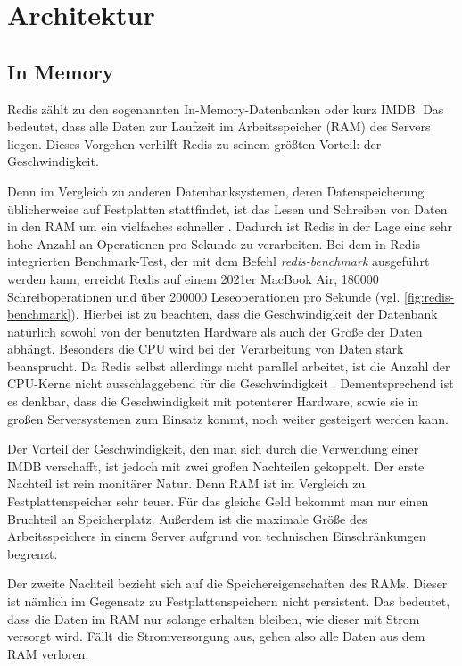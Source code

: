 \section{Architektur}

\subsection{In Memory}
Redis zählt zu den sogenannten In-Memory-Datenbanken oder kurz IMDB. 
Das bedeutet, dass alle Daten zur Laufzeit im Arbeitsspeicher (RAM) des Servers liegen.
Dieses Vorgehen verhilft Redis zu seinem größten Vorteil: der Geschwindigkeit.

Denn im Vergleich zu anderen Datenbanksystemen, deren Datenspeicherung üblicherweise auf Festplatten stattfindet, ist das Lesen und Schreiben von Daten in den RAM um ein vielfaches schneller \cite{VL_Rechnerarchitektur}.
Dadurch ist Redis in der Lage eine sehr hohe Anzahl an Operationen pro Sekunde zu verarbeiten.
Bei dem in Redis integrierten Benchmark-Test, der mit dem Befehl \textit{redis-benchmark} ausgeführt werden kann, erreicht Redis auf einem 2021er MacBook Air, 180000 Schreiboperationen und über 200000 Leseoperationen pro Sekunde (vgl. \autoref{fig:redis-benchmark}).
Hierbei ist zu beachten, dass die Geschwindigkeit der Datenbank natürlich sowohl von der benutzten Hardware als auch der Größe der Daten abhängt.
Besonders die CPU wird bei der Verarbeitung von Daten stark beansprucht. Da Redis selbst allerdings nicht parallel arbeitet, ist die Anzahl der CPU-Kerne nicht ausschlaggebend für die Geschwindigkeit \cite{Redis-Docs-Benchmarks}.
Dementsprechend ist es denkbar, dass die Geschwindigkeit mit potenterer Hardware, sowie sie in großen Serversystemen zum Einsatz kommt, noch weiter gesteigert werden kann.

Der Vorteil der Geschwindigkeit, den man sich durch die Verwendung einer IMDB verschafft, ist jedoch mit zwei großen Nachteilen gekoppelt.
Der erste Nachteil ist rein monitärer Natur. 
Denn RAM ist im Vergleich zu Festplattenspeicher sehr teuer. Für das gleiche Geld bekommt man nur einen Bruchteil an Speicherplatz.
Außerdem ist die maximale Größe des Arbeitsspeichers in einem Server aufgrund von technischen Einschränkungen begrenzt.

Der zweite Nachteil bezieht sich auf die Speichereigenschaften des RAMs.
Dieser ist nämlich im Gegensatz zu Festplattenspeichern nicht persistent.
Das bedeutet, dass die Daten im RAM nur solange erhalten bleiben, wie dieser mit Strom versorgt wird.
Fällt die Stromversorgung aus, gehen also alle Daten aus dem RAM verloren. 

